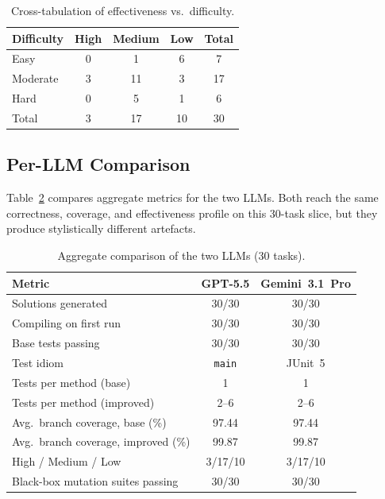 \documentclass[journal]{IEEEtran}
\begin{document}
\begin{table}[!t]
\centering
\caption{Cross-tabulation of effectiveness vs.\ difficulty.}
\label{tab:effdiff}
\renewcommand{\arraystretch}{1.15}
\begin{tabular}{@{}l c c c c@{}}
\toprule
\textbf{Difficulty} & \textbf{High} & \textbf{Medium}
                    & \textbf{Low}  & \textbf{Total} \\
\midrule
Easy     & 0 & 1  & 6  & 7  \\
Moderate & 3 & 11 & 3  & 17 \\
Hard     & 0 & 5  & 1  & 6  \\
\midrule
Total    & 3 & 17 & 10 & 30 \\
\bottomrule
\end{tabular}
\end{table}

\subsection{Per-LLM Comparison}
Table~\ref{tab:llmcompare} compares aggregate metrics for the
two LLMs. Both reach the same correctness, coverage, and
effectiveness profile on this 30-task slice, but they produce
stylistically different artefacts.

\begin{table}[!t]
\centering
\caption{Aggregate comparison of the two LLMs (30 tasks).}
\label{tab:llmcompare}
\renewcommand{\arraystretch}{1.15}
\begin{tabular}{@{}p{} c c@{}}
\toprule
\textbf{Metric} & \textbf{GPT-5.5} & \textbf{Gemini~3.1~Pro} \\
\midrule
Solutions generated                  & 30/30 & 30/30 \\
Compiling on first run               & 30/30 & 30/30 \\
Base tests passing                   & 30/30 & 30/30 \\
Test idiom                           & \texttt{main} & JUnit~5 \\
Tests per method (base)              & 1     & 1 \\
Tests per method (improved)          & 2--6  & 2--6 \\
Avg.\ branch coverage, base (\%)     & 97.44 & 97.44 \\
Avg.\ branch coverage, improved (\%) & 99.87 & 99.87 \\
High / Medium / Low                  & 3/17/10 & 3/17/10 \\
Black-box mutation suites passing    & 30/30 & 30/30 \\
\bottomrule
\end{tabular}
\end{table}
\end{document}
